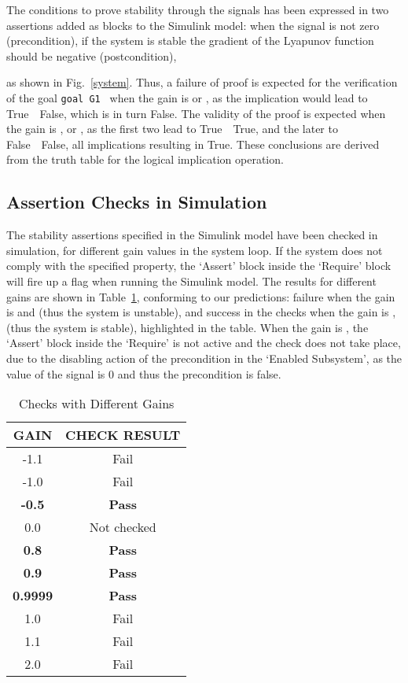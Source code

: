 \documentclass[a4paper]{article}
\begin{document}
The conditions to prove stability through the signals has been expressed in two assertions added as blocks to the Simulink model: when the signal  is not zero (precondition), if the system is stable the gradient of the Lyapunov function should be negative (postcondition), 

as shown in Fig.~\ref{system}. Thus, a failure of proof is expected for the verification of the goal \verb+goal G1 + when the gain is  or , as the implication would lead to True~~False, which is in turn False. The validity of the proof is expected when the gain is ,  or , as the first two lead to True~~True, and the later to False~~False, all implications resulting in True. These conclusions are derived from the truth table for the logical implication operation. 

\subsection{Assertion Checks in Simulation}

The stability assertions specified in the Simulink model have been checked in simulation, for different gain values in the system loop. If the system does not comply with the specified property, the `Assert' block inside the `Require' block will fire up a flag when running the Simulink model. The results for different gains are shown in Table~\ref{check}, conforming to our predictions: failure when the gain is  and  (thus the system is unstable), and success in the checks when the gain is ,  (thus the system is stable), highlighted in the table. When the gain is , the `Assert' block inside the `Require' is not active and the check does not take place, due to the disabling action of the precondition in the `Enabled Subsystem', as the value of the signal  is 0 and thus the precondition is false. 

\begin{table}[!t]
\renewcommand{\arraystretch}{1.3}
\caption{Checks with Different Gains}
\label{check}
\centering
\begin{tabular}{|c|c|}
\hline
GAIN&CHECK RESULT\\ \hline \hline
-1.1&Fail \\ \hline
-1.0&Fail \\ \hline
\textbf{-0.5}&\textbf{Pass} \\ \hline
0.0&Not checked\\ \hline
\textbf{0.8}&\textbf{Pass}\\ \hline
\textbf{0.9}&\textbf{Pass}\\ \hline
\textbf{0.9999}&\textbf{Pass}\\ \hline 
1.0&Fail \\ \hline
1.1&Fail \\ \hline
2.0&Fail \\ \hline
\end{tabular}
\vspace{-0.1cm}
\end{table}
\end{document}
